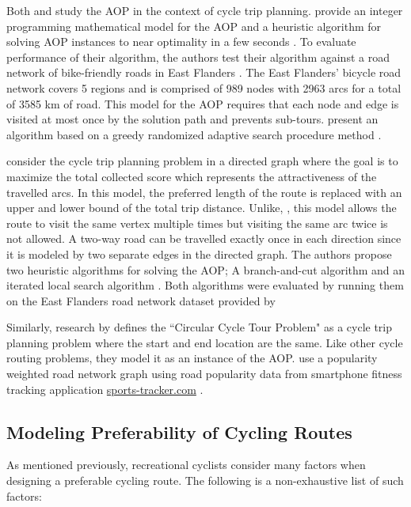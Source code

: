 \documentclass[honors]{union-cs-thesis}
\begin{document}
Both \citeauthor{souffriau2011planning} and \citeauthor{verbeeck2014extension} study the AOP in the context of cycle trip planning. \citeauthor{souffriau2011planning} provide an integer programming mathematical model for the AOP and a heuristic algorithm for solving AOP instances to near optimality in a few seconds \cite{souffriau2011planning, verbeeck2014extension}. To evaluate performance of their algorithm, the authors test their algorithm against a road network of bike-friendly roads in East Flanders \cite{souffriau2011planning}. The East Flanders' bicycle road network covers 5 regions and is comprised of 989 nodes with 2963 arcs for a total of 3585 km of road. This model for the AOP requires that each node and edge is visited at most once by the solution path and prevents sub-tours. \citeauthor{souffriau2011planning} present an algorithm based on a greedy randomized adaptive search procedure method \cite{souffriau2011planning}.

\citeauthor{verbeeck2014extension} consider the cycle trip planning problem in a directed graph where the goal is to maximize the total collected score which represents the attractiveness of the travelled arcs. In this model, the preferred length of the route is replaced with an upper and lower bound of the total trip distance. Unlike, \citeauthor{souffriau2011planning}, this model allows the route to visit the same vertex multiple times but visiting the same arc twice is not allowed. A two-way road can be travelled exactly once in each direction since it is modeled by two separate edges in the directed graph. The authors propose two heuristic algorithms for solving the AOP; A branch-and-cut algorithm and an iterated local search algorithm \cite{verbeeck2014extension}. Both algorithms were evaluated by running them on the East Flanders road network dataset provided by \citeauthor{souffriau2011planning}

Similarly, research by \citeauthor{bergman2015optimization} defines the ``Circular Cycle Tour Problem" as a cycle trip planning problem where the start and end location are the same. Like other cycle routing problems, they model it as an instance of the AOP. \citeauthor{bergman2015optimization} use a popularity weighted road network graph using road popularity data from smartphone fitness tracking application \href{http://www.sports-tracker.com/}{sports-tracker.com} \cite{bergman2015optimization}.

\subsection{Modeling Preferability of Cycling Routes} \label{routefactors}
As mentioned previously, recreational cyclists consider many factors when designing a preferable cycling route. The following is a non-exhaustive list of such factors:
\end{document}
